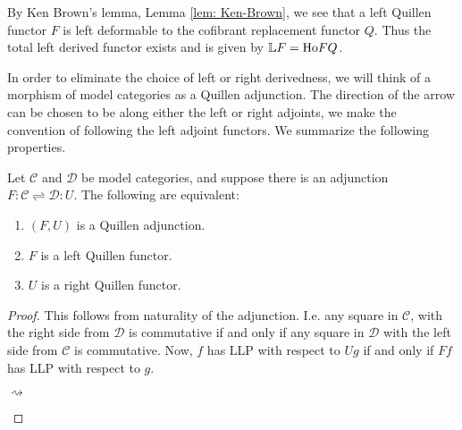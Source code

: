 \documentclass[../thesis.tex]{subfiles}
\begin{document}
            \begin{remark}
                By Ken Brown's lemma, Lemma \ref{lem: Ken-Brown}, we see that a left Quillen functor $F$ is left deformable to the cofibrant replacement functor $Q$. Thus the total left derived functor exists and is given by $\mathbb{L}F = \tt{Ho} FQ$.
            \end{remark}

            In order to eliminate the choice of left or right derivedness, we will think of a morphism of model categories as a Quillen adjunction. The direction of the arrow can be chosen to be along either the left or right adjoints, we make the convention of following the left adjoint functors. We summarize the following properties.

            \begin{lemma}\label{lem: Quill-adj}
                Let $\mathcal{C}$ and $\mathcal{D}$ be model categories, and suppose there is an adjunction $F:\mathcal{C}\rightleftharpoons\mathcal{D}:U$. The following are equivalent:
                \begin{enumerate}
                    \item $(F,U)$ is a Quillen adjunction.
                    \item $F$ is a left Quillen functor.
                    \item $U$ is a right Quillen functor.
                \end{enumerate}
            \end{lemma}

            \begin{proof}
                This follows from naturality of the adjunction. I.e. any square in $\mathcal{C}$, with the right side from $\mathcal{D}$ is commutative if and only if any square in $\mathcal{D}$ with the left side from $\mathcal{C}$ is commutative. Now, $f$ has LLP with respect to $Ug$ if and only if $Ff$ has LLP with respect to $g$.
                \begin{center}
                     $\rightsquigarrow$
                \end{center} 
            \end{proof}
\end{document}
